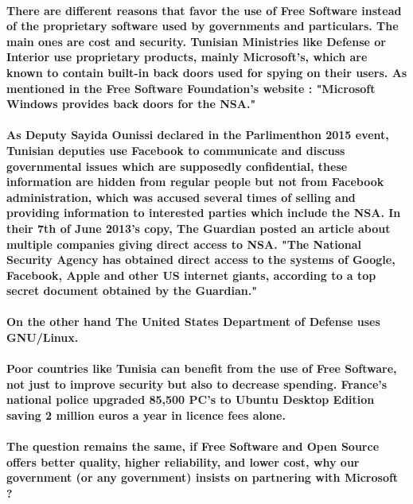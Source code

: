 
\newpage
\vspace{3cm}
 
\NewsItem{\textcolor[rgb]{0.55,0,0}{\huge Free Software in Tunisian Government}}

\paragraph*{There are different reasons that favor the use of Free Software instead of the proprietary software used by governments and particulars. The main ones are cost and security.
Tunisian Ministries like Defense or Interior use proprietary products, mainly Microsoft's, which are known to contain built-in back doors used for spying on their users. As mentioned in the Free Software Foundation's website : "Microsoft Windows provides back doors for the NSA."}
\paragraph*{As Deputy Sayida Ounissi declared in the Parlimenthon 2015 event, Tunisian deputies use Facebook to communicate and discuss governmental issues which are supposedly confidential, these information are hidden from regular people but not from Facebook administration, which was accused several times of selling and providing information to interested parties which include the NSA. In their 7th of June 2013's copy, The Guardian posted an article about multiple companies giving direct access to NSA. "The National Security Agency has obtained direct access to the systems of Google, Facebook, Apple and other US internet giants, according to a top secret document obtained by the Guardian."}
\paragraph*{On the other hand The United States Department of Defense uses GNU/Linux.}
\paragraph*{Poor countries like Tunisia can benefit from the use of Free Software, not just to improve security but also to decrease spending.
France's national police upgraded 85,500 PC's to Ubuntu Desktop Edition saving 2 million euros a year in licence fees alone.}
\paragraph*{The question remains the same, if Free Software and Open Source offers better quality, higher reliability, and lower cost, why our government (or any government) insists on partnering with Microsoft ?\\}

